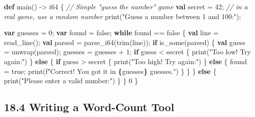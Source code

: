 \documentclass[
  english,
]{book}
\newenvironment{Shaded}{\begin{snugshade}}{\end{snugshade}}
\newcommand{\CommentTok}[1]{\textcolor[rgb]{0.42,0.60,0.33}{\textit{#1}}}
\newcommand{\ConstantTok}[1]{\textcolor[rgb]{0.31,0.76,1.00}{#1}}
\newcommand{\ControlFlowTok}[1]{\textcolor[rgb]{0.77,0.53,0.75}{\textbf{#1}}}
\newcommand{\DataTypeTok}[1]{\textcolor[rgb]{0.31,0.79,0.69}{#1}}
\newcommand{\DecValTok}[1]{\textcolor[rgb]{0.71,0.81,0.66}{#1}}
\newcommand{\FunctionTok}[1]{\textcolor[rgb]{0.86,0.86,0.67}{#1}}
\newcommand{\KeywordTok}[1]{\textcolor[rgb]{0.34,0.61,0.84}{\textbf{#1}}}
\newcommand{\NormalTok}[1]{\textcolor[rgb]{0.83,0.83,0.83}{#1}}
\newcommand{\OperatorTok}[1]{\textcolor[rgb]{0.83,0.83,0.83}{#1}}
\newcommand{\StringTok}[1]{\textcolor[rgb]{0.81,0.57,0.47}{#1}}
\begin{document}
\begin{Shaded}
\begin{Highlighting}[]
\KeywordTok{def}\NormalTok{ main() }\OperatorTok{{-}\textgreater{}} \DataTypeTok{i64}\NormalTok{ \{}
    \CommentTok{// Simple "guess the number" game}
    \KeywordTok{val}\NormalTok{ secret }\OperatorTok{=} \DecValTok{42}\NormalTok{;    }\CommentTok{// in a real game, use a random number}
    \FunctionTok{print}\NormalTok{(}\StringTok{"Guess a number between 1 and 100:"}\NormalTok{);}

    \KeywordTok{var}\NormalTok{ guesses }\OperatorTok{=} \DecValTok{0}\NormalTok{;}
    \KeywordTok{var}\NormalTok{ found }\OperatorTok{=} \ConstantTok{false}\NormalTok{;}
    \ControlFlowTok{while}\NormalTok{ found }\OperatorTok{==} \ConstantTok{false}\NormalTok{ \{}
        \KeywordTok{val}\NormalTok{ line }\OperatorTok{=} \FunctionTok{read\_line}\NormalTok{();}
        \KeywordTok{val}\NormalTok{ parsed }\OperatorTok{=} \FunctionTok{parse\_i64}\NormalTok{(}\FunctionTok{trim}\NormalTok{(line));}
        \ControlFlowTok{if} \FunctionTok{is\_some}\NormalTok{(parsed) \{}
            \KeywordTok{val}\NormalTok{ guess }\OperatorTok{=}\NormalTok{ unwrap(parsed);}
\NormalTok{            guesses }\OperatorTok{=}\NormalTok{ guesses }\OperatorTok{+} \DecValTok{1}\NormalTok{;}
            \ControlFlowTok{if}\NormalTok{ guess }\OperatorTok{\textless{}}\NormalTok{ secret \{}
                \FunctionTok{print}\NormalTok{(}\StringTok{"Too low! Try again:"}\NormalTok{)}
\NormalTok{            \} }\ControlFlowTok{else}\NormalTok{ \{}
                \ControlFlowTok{if}\NormalTok{ guess }\OperatorTok{\textgreater{}}\NormalTok{ secret \{}
                    \FunctionTok{print}\NormalTok{(}\StringTok{"Too high! Try again:"}\NormalTok{)}
\NormalTok{                \} }\ControlFlowTok{else}\NormalTok{ \{}
\NormalTok{                    found }\OperatorTok{=} \ConstantTok{true}\NormalTok{;}
                    \FunctionTok{print}\NormalTok{(}\StringTok{f"Correct! You got it in }\ControlFlowTok{\{}\NormalTok{guesses}\ControlFlowTok{\}}\StringTok{ guesses."}\NormalTok{)}
\NormalTok{                \}}
\NormalTok{            \}}
\NormalTok{        \} }\ControlFlowTok{else}\NormalTok{ \{}
            \FunctionTok{print}\NormalTok{(}\StringTok{"Please enter a valid number:"}\NormalTok{)}
\NormalTok{        \}}
\NormalTok{    \}}
    \DecValTok{0}
\NormalTok{\}}
\end{Highlighting}
\end{Shaded}

\subsection{18.4 Writing a Word-Count
Tool}\label{writing-a-word-count-tool}
\end{document}
